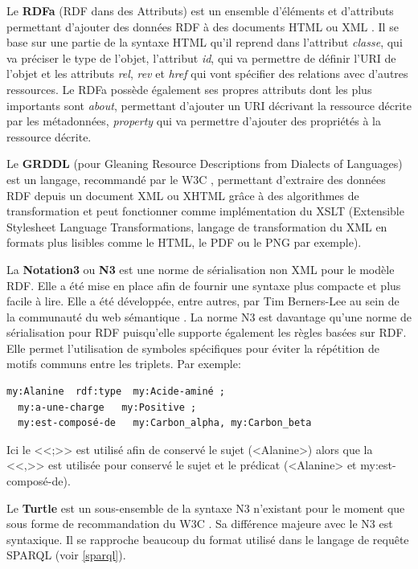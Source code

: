 Le \textbf{RDFa} (RDF dans des Attributs) est un ensemble d'éléments et d'attributs permettant d'ajouter des données RDF à des documents HTML ou XML \cite{adida2008rdfa}. Il se base sur une partie de la syntaxe HTML qu'il reprend dans l'attribut \textit{classe}, qui va préciser le type de l'objet, l'attribut \textit{id}, qui va permettre de définir l'URI de l'objet et les attributs \textit{rel}, \textit{rev} et \textit{href} qui vont spécifier des relations avec d'autres ressources. Le RDFa possède également ses propres attributs dont les plus importants sont \textit{about}, permettant d'ajouter un URI décrivant la ressource décrite par les métadonnées, \textit{property} qui va permettre d'ajouter des propriétés à la ressource décrite.

Le \textbf{GRDDL} (pour Gleaning Resource Descriptions from Dialects of Languages) est un langage, recommandé par le W3C \cite{connolly2007gleaning}, permettant d'extraire des données RDF depuis un document XML ou XHTML grâce à des algorithmes de transformation et peut fonctionner comme implémentation du XSLT (Extensible Stylesheet Language Transformations, langage de transformation du XML en formats plus lisibles comme le HTML, le PDF ou le PNG par exemple).

La \textbf{Notation3} ou \textbf{N3} est une norme de sérialisation non XML pour le modèle RDF. Elle a été mise en place afin de fournir une syntaxe plus compacte et plus facile à lire. Elle a été développée, entre autres, par Tim Berners-Lee au sein de la communauté du web sémantique \cite{berners2008n3logic}. La norme N3 est davantage qu'une norme de sérialisation pour RDF puisqu'elle supporte également les règles basées sur RDF. Elle permet l'utilisation de symboles spécifiques pour éviter la répétition de motifs communs entre les triplets. Par exemple:

\begin{lstlisting}
my:Alanine  rdf:type  my:Acide-aminé ; 
  my:a-une-charge   my:Positive ; 
  my:est-composé-de   my:Carbon_alpha, my:Carbon_beta 
\end{lstlisting} 


Ici le <<;>> est utilisé afin de conservé le sujet (<Alanine>) alors que la <<,>> est utilisée pour conservé le sujet et le prédicat (<Alanine> et my:est-composé-de).

Le \textbf{Turtle} est un sous-ensemble de la syntaxe N3 n'existant pour le moment que sous forme de recommandation du W3C \cite{prud2013turtle}. Sa différence majeure avec le N3 est syntaxique. Il se rapproche beaucoup du format utilisé dans le langage de requête SPARQL (voir \ref{sparql}).

